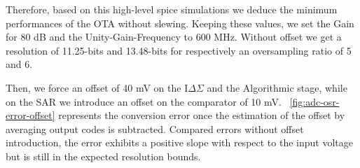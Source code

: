Therefore, based on this high-level spice simulations we deduce the minimum performances of the OTA without slewing. Keeping these values, we set the Gain for 80 dB and the Unity-Gain-Frequency to 600 MHz. Without offset we get a resolution of 11.25-bits and 13.48-bits for respectively an oversampling ratio of 5 and 6.

Then, we force an offset of 40 mV on the I\(\Delta\Sigma\) and the Algorithmic stage, while on the SAR we introduce an offset on the comparator of 10 mV. \figurename~\ref{fig:adc-osr-error-offset} represents the conversion error once the estimation of the offset by averaging output codes is subtracted. Compared errors without offset introduction, the error exhibits a positive slope with respect to the input voltage but is still in the expected resolution bounds.

